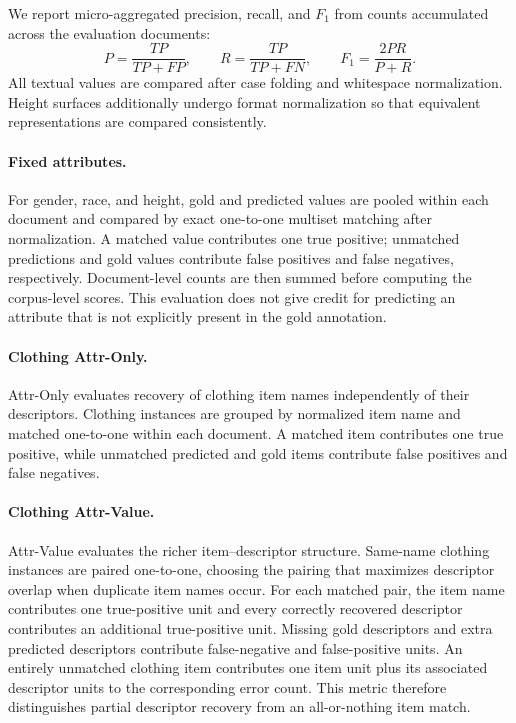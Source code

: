 \documentclass[sigconf,nonacm]{acmart}
\begin{document}
We report micro-aggregated precision, recall, and $F_1$ from counts accumulated
across the evaluation documents:
\begin{equation}
P=\frac{TP}{TP+FP},\qquad
R=\frac{TP}{TP+FN},\qquad
F_1=\frac{2PR}{P+R}.
\label{eq:prf}
\end{equation}
All textual values are compared after case folding and whitespace
normalization.  Height surfaces additionally undergo format normalization so
that equivalent representations are compared consistently.

\paragraph{Fixed attributes.}
For gender, race, and height, gold and predicted values are pooled within each
document and compared by exact one-to-one multiset matching after
normalization.  A matched value contributes one true positive; unmatched
predictions and gold values contribute false positives and false negatives,
respectively.  Document-level counts are then summed before computing the
corpus-level scores.  This evaluation does not give credit for predicting an
attribute that is not explicitly present in the gold annotation.

\paragraph{Clothing Attr-Only.}
Attr-Only evaluates recovery of clothing item names independently of their
descriptors.  Clothing instances are grouped by normalized item name and
matched one-to-one within each document.  A matched item contributes one true
positive, while unmatched predicted and gold items contribute false positives
and false negatives.

\paragraph{Clothing Attr-Value.}
Attr-Value evaluates the richer item--descriptor structure.  Same-name clothing
instances are paired one-to-one, choosing the pairing that maximizes descriptor
overlap when duplicate item names occur.  For each matched pair, the item name
contributes one true-positive unit and every correctly recovered descriptor
contributes an additional true-positive unit.  Missing gold descriptors and
extra predicted descriptors contribute false-negative and false-positive units.
An entirely unmatched clothing item contributes one item unit plus its
associated descriptor units to the corresponding error count.  This metric
therefore distinguishes partial descriptor recovery from an all-or-nothing
item match.
\end{document}
